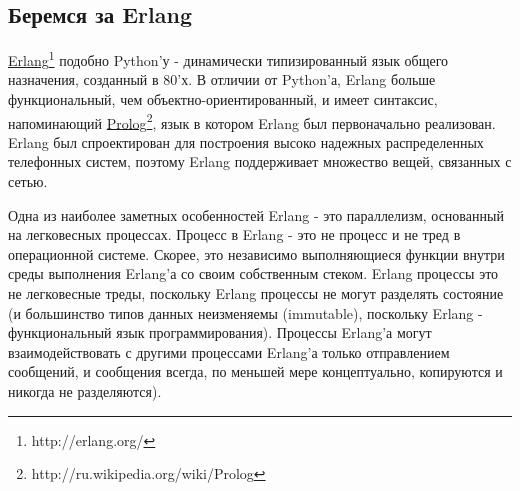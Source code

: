 \subsection{Беремся за Erlang}

\href{http://erlang.org/}{Erlang}\footnote[1]{http://erlang.org/} 
подобно Python'у - динамически типизированный язык общего 
назначения, созданный в 80'х. В отличии от Python'а, Erlang больше 
функциональный, чем объектно-ориентированный, и имеет синтаксис, 
напоминающий \href{http://ru.wikipedia.org/wiki/Prolog}{Prolog}\footnote[2]{http://ru.wikipedia.org/wiki/Prolog}, 
язык в котором Erlang был первоначально реализован. 
Erlang был спроектирован для построения высоко 
надежных распределенных телефонных систем, поэтому 
Erlang поддерживает множество вещей, связанных с сетью.


Одна из наиболее заметных особенностей Erlang - это  
параллелизм, основанный на легковесных процессах. 
Процесс в Erlang - это не процесс и не тред в операционной 
системе. Скорее, это независимо выполняющиеся функции 
внутри среды выполнения Erlang'а со своим собственным стеком. 
Erlang процессы это не легковесные треды, поскольку 
Erlang процессы не могут разделять состояние (и большинство 
типов данных неизменяемы (immutable), поскольку Erlang - функциональный 
язык программирования). Процессы Erlang'а могут взаимодействовать с 
другими процессами Erlang'а только отправлением сообщений, и сообщения 
всегда, по меньшей мере концептуально, копируются и никогда не разделяются). 


